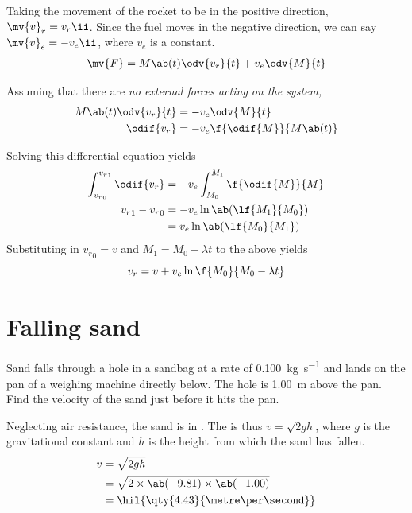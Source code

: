 Taking the movement of the rocket to be in the positive direction,
\(\mv{v}_r = v_r\ii\).
Since the fuel moves in the negative direction,
we can say \(\mv{v}_e = -v_e\ii\), where \(v_e\) is a constant.
\begin{align*}
	\mv{F} = M\ab(t)\odv{v_r}{t} + v_e\odv{M}{t}
\end{align*}

Assuming that there are \it{no external forces} acting on the system,
\begin{align*}
	M\ab(t)\odv{v_r}{t} & = -v_e\odv{M}{t}            \\
	\odif{v_r}          & = -v_e\f{\odif{M}}{M\ab(t)}
\end{align*}

Solving this differential equation yields
\begin{align*}
	\int_{{v_r}_0}^{{v_r}_1}\odif{v_r} & =
	-v_e\int_{M_0}^{M_1}\f{\odif{M}}{M}                              \\
	{v_r}_1 - {v_r}_0                  & = -v_e\ln\ab(\lf{M_1}{M_0}) \\
	                                   & = v_e\ln\ab(\lf{M_0}{M_1})
\end{align*}
Substituting in \({v_r}_0 = v\) and \(M_1 = M_0 - \lambda t\) to the
above yields
\begin{equation}
	v_r = v + v_e\ln\f{M_0}{M_0 - \lambda t}
	\label{eq:rocketans}
\end{equation}

\section{Falling sand}
\begin{problem}
Sand falls through a hole in a sandbag at a rate of
\qty{0.100}{\kg\per\second} and lands
on the pan of a weighing machine directly below. The hole is
\qty{1.00}{\metre} above the pan.
Find the velocity of the sand just before it hits the pan.
\end{problem}

Neglecting air resistance, the sand is in . The
 is thus
\(v = \sqrt{2gh}\), where \(g\) is the gravitational constant and
\(h\) is the height from which
the sand has fallen.
\begin{align*}
	v & = \sqrt{2 g h}                                 \\
	  & = \sqrt{2 \times \ab(-9.81) \times \ab(-1.00)} \\
	  & = \hil{\qty{4.43}{\metre\per\second}}
\end{align*}

